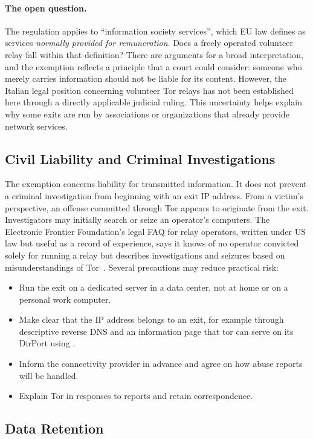 \paragraph{The open question.} The regulation applies to \enquote{information society services}, which EU law defines as services \emph{normally provided for remuneration}. Does a freely operated volunteer relay fall within that definition? There are arguments for a broad interpretation, and the exemption reflects a principle that a court could consider: someone who merely carries information should not be liable for its content. However, the Italian legal position concerning volunteer Tor relays has not been established here through a directly applicable judicial ruling. This uncertainty helps explain why some exits are run by associations or organizations that already provide network services.

\subsection{Civil Liability and Criminal Investigations}

The exemption concerns liability for transmitted information. It does not prevent a criminal investigation from beginning with an exit IP address. From a victim's perspective, an offense committed through Tor appears to originate from the exit. Investigators may initially search or seize an operator's computers. The Electronic Frontier Foundation's legal FAQ for relay operators, written under US law but useful as a record of experience, says it knows of no operator convicted solely for running a relay but describes investigations and seizures based on misunderstandings of Tor~\cite{efflegalfaq}. Several precautions may reduce practical risk:
\begin{itemize}
  \item Run the exit on a dedicated server in a data center, not at home or on a personal work computer.
  \item Make clear that the IP address belongs to an exit, for example through descriptive reverse DNS and an information page that tor can serve on its DirPort using .
  \item Inform the connectivity provider in advance and agree on how abuse reports will be handled.
  \item Explain Tor in responses to reports and retain correspondence.
\end{itemize}

\subsection{Data Retention}

